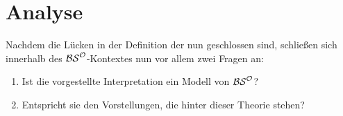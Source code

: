 %         
%     
% 
%                 

%     
%     
%     
% 
%         
%     
%     

\section{Analyse}\label{sec:analyse}
    Nachdem die Lücken in der Definition der \strukt nun geschlossen sind, schließen sich innerhalb des $\mathcal{BS}^{\mathcal{O}}$-Kontextes nun vor allem zwei Fragen an:%
    \begin{enumerate}
        \item Ist die vorgestellte Interpretation ein Modell von $\mathcal{BS}^{\mathcal{O}}$?
        \item Entspricht sie den Vorstellungen, die hinter dieser Theorie stehen?
    \end{enumerate}

